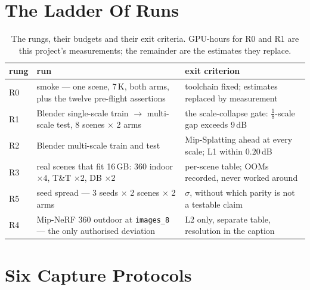 \section{The Ladder Of Runs}
\begin{table}[htbp]
  \centering
  \caption{The rungs, their budgets and their exit criteria. GPU-hours for R0
  and R1 are this project's measurements; the remainder are the estimates they
  replace.}
  \label{tab:ladder}
  \small
  \begin{tabularx}{\linewidth}{lL{0.95}L{1.05}}
    \toprule
    rung & run & exit criterion \\
    \midrule
    R0 & smoke --- one scene, 7\,K, both arms, plus the twelve pre-flight assertions & toolchain fixed; estimates replaced by measurement \\
    R1 & Blender single-scale train $\rightarrow$ multi-scale test, 8 scenes $\times$ 2 arms & the scale-collapse gate: $\tfrac18$-scale gap exceeds 9\,dB \\
    R2 & Blender multi-scale train and test & Mip-Splatting ahead at every scale; L1 within $0.20$\,dB \\
    R3 & real scenes that fit 16\,GB: 360 indoor $\times4$, T\&T $\times2$, DB $\times2$ & per-scene table; OOMs recorded, never worked around \\
    R5 & seed spread --- 3 seeds $\times$ 2 scenes $\times$ 2 arms & $\sigma$, without which parity is not a testable claim \\
    R4 & Mip-NeRF 360 outdoor at \texttt{images\_8} --- the only authorised deviation & L2 only, separate table, resolution in the caption \\
    \bottomrule
  \end{tabularx}
\end{table}

\section{Six Capture Protocols}
\label{sec:stress}

